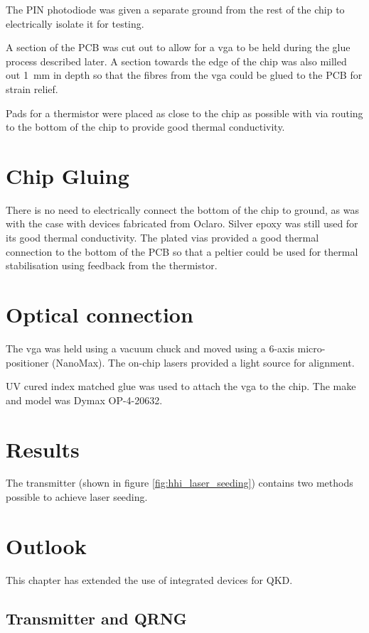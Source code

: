 The PIN photodiode was given a separate ground from the rest of the chip to electrically isolate it for testing.

A section of the PCB was cut out to allow for a \ac{vga} to be held during the glue process described later. A section towards the edge of the chip was also milled out \SI{1}{mm} in depth so that the fibres from the \ac{vga} could be glued to the PCB for strain relief.

Pads for a thermistor were placed as close to the chip as possible with via routing to the bottom of the chip to provide good thermal conductivity.

\section{Chip Gluing}

There is no need to electrically connect the bottom of the chip to ground, as was with the case with devices fabricated from Oclaro. Silver epoxy was still used for its good thermal conductivity. The plated vias provided a good thermal connection to the bottom of the PCB so that a peltier could be used for thermal stabilisation using feedback from the thermistor.

\section{Optical connection}

The \ac{vga} was held using a vacuum chuck and moved using a 6-axis micro-positioner (NanoMax). The on-chip lasers provided a light source for alignment. 

UV cured index matched glue was used to attach the \ac{vga} to the chip. The make and model was Dymax OP-4-20632.

\section{Results}

The transmitter (shown in figure \ref{fig:hhi_laser_seeding}) contains two methods possible to achieve laser seeding.

\section{Outlook}

This chapter has extended the use of integrated devices for \acl{QKD}.

\subsection{Transmitter and QRNG}

